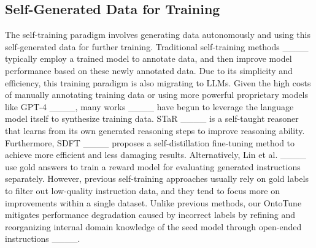 \subsection{Self-Generated Data for Training}
The self-training paradigm involves generating data autonomously and using this self-generated data for further training. Traditional self-training methods ____ typically employ a trained model to annotate data, and then improve model performance based on these newly annotated data. Due to its simplicity and efficiency, this training paradigm is also migrating to LLMs. Given the high costs of manually annotating training data or using more powerful proprietary models like GPT-4 ____, many works ____ have begun to leverage the language model itself to synthesize training data. STaR ____ is a self-taught reasoner that learns from its own generated reasoning steps to improve reasoning ability. Furthermore, SDFT ____ proposes a self-distillation fine-tuning method to achieve more efficient and less damaging results. Alternatively, Lin et al. ____ use gold answers to train a reward model for evaluating generated instructions separately. However, previous self-training approaches usually rely on gold labels to filter out low-quality instruction data, and they tend to focus more on improvements within a single dataset. Unlike previous methods, our OntoTune mitigates performance degradation caused by incorrect labels by refining and reorganizing internal domain knowledge of the seed model through open-ended instructions ____.